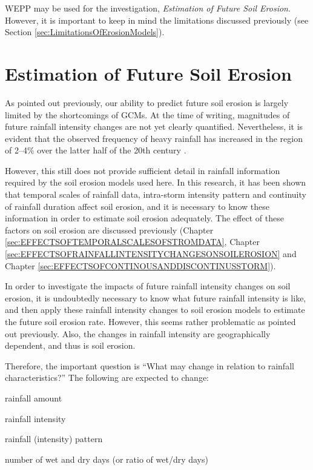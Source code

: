 WEPP may be used for the investigation, \textit{Estimation of Future Soil
Erosion}. However, it is important to keep in mind the limitations discussed
previously (see Section \ref{sec:LimitationsOfErosionModels}).


\section{Estimation of Future Soil Erosion}
\label{sec:MethodsEstimatedFutureSoilErosion}

As pointed out previously, our ability to predict future soil erosion is largely
limited by the shortcomings of GCMs. At the time of writing, magnitudes of
future rainfall intensity changes are not yet clearly quantified. Nevertheless,
it is evident that the observed frequency of heavy rainfall has increased in the
region of 2--4\% over the latter half of the 20th century \citep{ipcc2001-881}.

However, this still does not provide sufficient detail in rainfall information
required by the soil erosion models used here. In this research, it has been
shown that temporal scales of rainfall data, intra-storm intensity pattern and
continuity of rainfall duration affect soil erosion, and it is necessary to know
these information in order to estimate soil erosion adequately. The effect of
these factors on soil erosion are discussed previously (Chapter
\ref{sec:EFFECTSOFTEMPORALSCALESOFSTROMDATA}, Chapter
\ref{sec:EFFECTSOFRAINFALLINTENSITYCHANGESONSOILEROSION} and Chapter
\ref{sec:EFFECTSOFCONTINOUSANDDISCONTINUSSTORM}).

In order to investigate the impacts of future rainfall intensity changes on soil
erosion, it is undoubtedly necessary to know what future rainfall intensity is
like, and then apply these rainfall intensity changes to soil erosion models to
estimate the future soil erosion rate. However, this seems rather problematic as
pointed out previously. Also, the changes in rainfall intensity are
geographically dependent, and thus is soil erosion.

Therefore, the important question is ``What may change in relation to rainfall
characteristics?'' The following are expected to change:
\begin{itemize*}
  \item rainfall amount
  \item rainfall intensity
  \item rainfall (intensity) pattern
  \item number of wet and dry days (or ratio of wet/dry days)
\end{itemize*}

